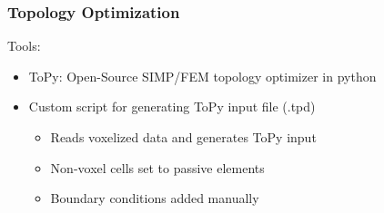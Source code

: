 \begin{frame}
		\frametitle{Topology Optimization}
		\begin{minipage}{0.85\textwidth}
			Tools:
			\begin{itemize}
			\item ToPy: Open-Source SIMP/FEM topology optimizer in python
			\item Custom script for generating ToPy input file (.tpd)
			\begin{itemize}
				\item Reads voxelized data and generates ToPy input
				\item Non-voxel cells set to passive elements
				\item Boundary conditions added manually
			\end{itemize}
			\end{itemize}
\end{minipage}
\end{frame}
